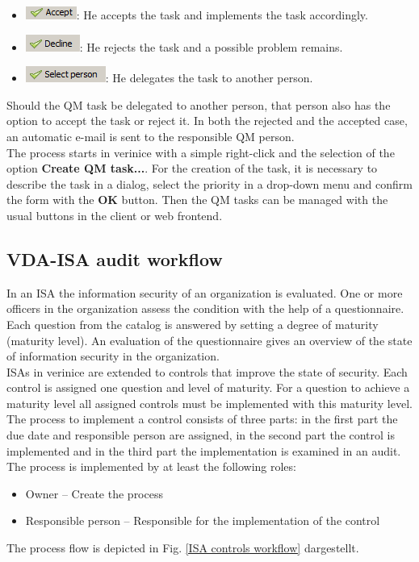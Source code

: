 \documentclass[a4paper,10pt]{book}
\begin{document}
\begin{itemize}
\item \includegraphics[height=2ex]{Icon/Akzeptieren-en.png}: He accepts the task and implements the task accordingly.
\item \includegraphics[height=2ex]{Icon/Ablehnen-en.png}: He rejects the task and a possible problem remains.
\item \includegraphics[height=2ex]{Icon/waehle_person-en.png}: He delegates the task to another person.
\end{itemize}
Should the QM task be delegated to another person, that person also has the option to accept the task or reject it. In both the rejected and the accepted case, an automatic e-mail is sent to the responsible QM person.
\newline\\
The process starts in verinice with a simple right-click and the selection of the option \textbf{Create QM task...}.
For the creation of the task, it is necessary to describe the task in a dialog, select the priority in a drop-down menu and confirm the form with the \textbf{OK} button.
Then the QM tasks can be managed with the usual buttons in the client or web frontend.

\subsection{VDA-ISA audit workflow}
In an ISA the information security of an organization is evaluated.
One or more officers in the organization assess the condition with the help of a questionnaire. Each question from the catalog is answered by setting a degree of maturity (maturity level). An evaluation of the questionnaire gives an overview of the state of information security in the organization.
\newline\\
ISAs in verinice are extended to controls that improve the state of security. Each control is assigned one question and level of maturity. For a question to achieve a maturity level all assigned controls must be implemented with this maturity level.
\newline\\
The process to implement a control consists of three parts: in the first part the due date and responsible person are assigned, in the second part the control is implemented and in the third part the implementation is examined in an audit. The process is implemented by at least the following roles:
\begin{itemize}
\item Owner – Create the process
\item Responsible person – Responsible for the implementation of the control
\end{itemize}
The process flow is depicted in Fig. \ref{ISA controls workflow} dargestellt.
\end{document}
